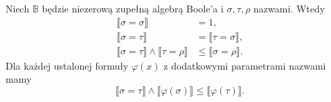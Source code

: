 \begin{lemat}
\label{lem:boolean35-equality}
Niech $\mathbb B$ będzie niezerową
zupełną algebrą Boole'a i
$\sigma,\tau,\rho$ nazwami.
Wtedy
\[
\begin{aligned}
\llbracket\sigma=\sigma\rrbracket&=1,\\
\llbracket\sigma=\tau\rrbracket
 &=\llbracket\tau=\sigma\rrbracket,\\
\llbracket\sigma=\tau\rrbracket\wedge
 \llbracket\tau=\rho\rrbracket
 &\le\llbracket\sigma=\rho\rrbracket.
\end{aligned}
\]
Dla każdej ustalonej formuły $\varphi(x)$
z dodatkowymi parametrami nazwami mamy
\[
 \llbracket\sigma=\tau\rrbracket\wedge
 \llbracket\varphi(\sigma)\rrbracket
 \le\llbracket\varphi(\tau)\rrbracket.
\]
\end{lemat}

